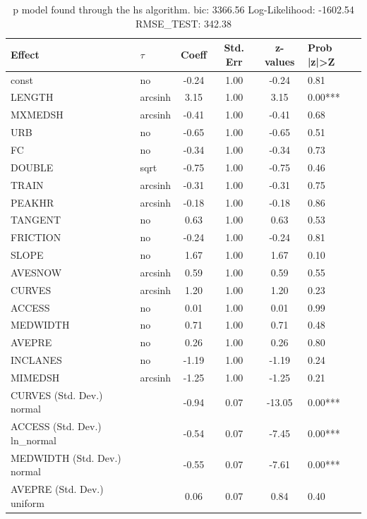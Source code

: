 \begin{table}
	\caption{p model found through the hs algorithm. bic: 3366.56 Log-Likelihood: -1602.54 RMSE_TEST: 342.38}
	\begin{center}
		\begin{tabular}{|l|l|c|c|c|l|}
			\hline
			Effect & $\tau$ & Coeff & Std. Err & z-values & Prob |z|>Z \\
			\hline
			const & no & -0.24 & 1.00 & -0.24 & 0.81 \\
			\hline
			LENGTH & arcsinh & 3.15 & 1.00 & 3.15 & 0.00*** \\
			\hline
			MXMEDSH & arcsinh & -0.41 & 1.00 & -0.41 & 0.68 \\
			\hline
			URB & no & -0.65 & 1.00 & -0.65 & 0.51 \\
			\hline
			FC & no & -0.34 & 1.00 & -0.34 & 0.73 \\
			\hline
			DOUBLE & sqrt & -0.75 & 1.00 & -0.75 & 0.46 \\
			\hline
			TRAIN & arcsinh & -0.31 & 1.00 & -0.31 & 0.75 \\
			\hline
			PEAKHR & arcsinh & -0.18 & 1.00 & -0.18 & 0.86 \\
			\hline
			TANGENT & no & 0.63 & 1.00 & 0.63 & 0.53 \\
			\hline
			FRICTION & no & -0.24 & 1.00 & -0.24 & 0.81 \\
			\hline
			SLOPE & no & 1.67 & 1.00 & 1.67 & 0.10 \\
			\hline
			AVESNOW & arcsinh & 0.59 & 1.00 & 0.59 & 0.55 \\
			\hline
			CURVES & arcsinh & 1.20 & 1.00 & 1.20 & 0.23 \\
			\hline
			ACCESS & no & 0.01 & 1.00 & 0.01 & 0.99 \\
			\hline
			MEDWIDTH & no & 0.71 & 1.00 & 0.71 & 0.48 \\
			\hline
			AVEPRE & no & 0.26 & 1.00 & 0.26 & 0.80 \\
			\hline
			INCLANES & no & -1.19 & 1.00 & -1.19 & 0.24 \\
			\hline
			MIMEDSH & arcsinh & -1.25 & 1.00 & -1.25 & 0.21 \\
			\hline
			CURVES (Std. Dev.) normal &  & -0.94 & 0.07 & -13.05 & 0.00*** \\
			\hline
			ACCESS (Std. Dev.) ln_normal &  & -0.54 & 0.07 & -7.45 & 0.00*** \\
			\hline
			MEDWIDTH (Std. Dev.) normal &  & -0.55 & 0.07 & -7.61 & 0.00*** \\
			\hline
			AVEPRE (Std. Dev.) uniform &  & 0.06 & 0.07 & 0.84 & 0.40 \\

\end{tabular}
\end{center}
\end{table}
